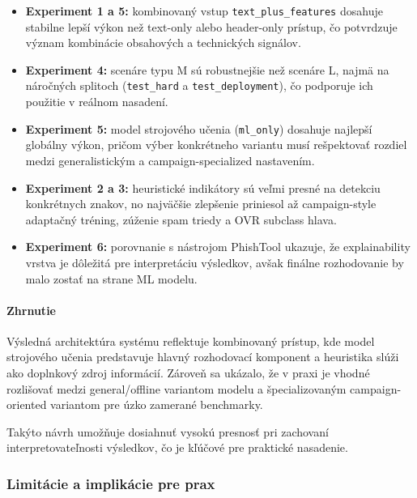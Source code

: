 \documentclass[conference]{IEEEtran}
\begin{document}
\begin{itemize}
    \item \textbf{Experiment 1 a 5:}
    kombinovaný vstup \texttt{text\_plus\_features} dosahuje stabilne lepší výkon
    než text-only alebo header-only prístup, čo potvrdzuje význam kombinácie
    obsahových a technických signálov.
    
    \item \textbf{Experiment 4:}
    scenáre typu M sú robustnejšie než scenáre L,
    najmä na náročných splitoch (\texttt{test\_hard} a \texttt{test\_deployment}),
    čo podporuje ich použitie v reálnom nasadení.
    
    \item \textbf{Experiment 5:}
    model strojového učenia (\texttt{ml\_only}) dosahuje najlepší globálny výkon,
    pričom výber konkrétneho variantu musí rešpektovať rozdiel medzi generalistickým
    a campaign-specialized nastavením.
    
    \item \textbf{Experiment 2 a 3:}
    heuristické indikátory sú veľmi presné na detekciu konkrétnych znakov,
    no najväčšie zlepšenie priniesol až campaign-style adaptačný tréning,
    zúženie spam triedy a OVR subclass hlava.
    
    \item \textbf{Experiment 6:}
    porovnanie s nástrojom PhishTool ukazuje,
    že explainability vrstva je dôležitá pre interpretáciu výsledkov,
    avšak finálne rozhodovanie by malo zostať na strane ML modelu.
\end{itemize}

\paragraph{Zhrnutie}

Výsledná architektúra systému reflektuje kombinovaný prístup,
kde model strojového učenia predstavuje hlavný rozhodovací komponent
a heuristika slúži ako doplnkový zdroj informácií. Zároveň sa ukázalo,
že v praxi je vhodné rozlišovať medzi general/offline variantom modelu
a špecializovaným campaign-oriented variantom pre úzko zamerané benchmarky.

Takýto návrh umožňuje dosiahnuť vysokú presnosť pri zachovaní
interpretovateľnosti výsledkov, čo je kľúčové pre praktické nasadenie.

\subsubsection*{Limitácie a implikácie pre prax}
\end{document}
